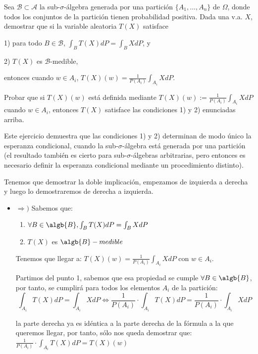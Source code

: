 \begin{problem}[2]Sea $\mathcal{B} \subset \mathcal{A}$ la sub-$\sigma$-\'algebra generada por una partici\'on
$\{A_1, \dots,A_n\}$ de $\Omega$, donde todos los conjuntos de la partici\'on tienen probabilidad positiva.
Dada una v.a. $X$, demostrar que si la variable aleatoria $T(X)$ satisface

1) para todo $B\in \mathcal{B}$, $\int_B T(X) dP = \int_B X dP$, y

2) $T(X)$ es  $\mathcal{B}$-medible, 

entonces cuando $w\in A_i$, $T(X)(w)= \frac{1}{P(A_i)}\int_{A_i} X dP$.

Probar que si  $T(X)(w)$ est\'a definida mediante  $T(X)(w):= \frac{1}{P(A_i)}\int_{A_i} X dP$ cuando  
 $w\in A_i$, entonces $T(X)$ satisface las condiciones 1) y 2) enunciadas arriba.

Este ejercicio demuestra que las condiciones 1) y 2) determinan de modo \'unico la esperanza condicional,
cuando la  sub-$\sigma$-\'algebra est\'a generada por una partici\'on (el resultado tambi\'en es cierto
para  sub-$\sigma$-\'algebras arbitrarias, pero entonces es necesario definir la esperanza condicional
mediante un procedimiento distinto).
\solution

\begin{expla}

Tenemos que demostrar la doble implicación, empezamos de izquierda a derecha y luego lo demostraremos de derecha a izquierda.
\end{expla}

\begin{itemize}
\item $\Rightarrow)$ Sabemos que:
\begin{enumerate}
\item $\forall B \in \algb{B}, \int_{B}T(X)dP = \int_{B}XdP$
\item $T(X)$ es $\algb{B}-medible$
\end{enumerate}

Tenemos que llegar a: $T(X)(w)= \frac{1}{P(A_i)}\int_{A_i} X dP$ con $w \in A_i$.

Partimos del punto 1, sabemos que esa propiedad se cumple $\forall B \in \algb{B}$, por tanto, se cumplirá para todos los elementos $A_i$ de la partición:
\[
\int_{A_i}T(X)dP = \int_{A_i}XdP  \Leftrightarrow  \frac{1}{P(A_i)}\cdot\int_{A_i}T(X)dP = \frac{1}{P(A_i)}\cdot\int_{A_i}XdP
\]

la parte derecha ya es idéntica a la parte derecha de la fórmula a la que queremos llegar, por tanto, sólo nos queda demostrar que: $\frac{1}{P(A_i)}\cdot\int_{A_i}T(X)dP = T(X)(w)$


\end{itemize}
\end{problem}

